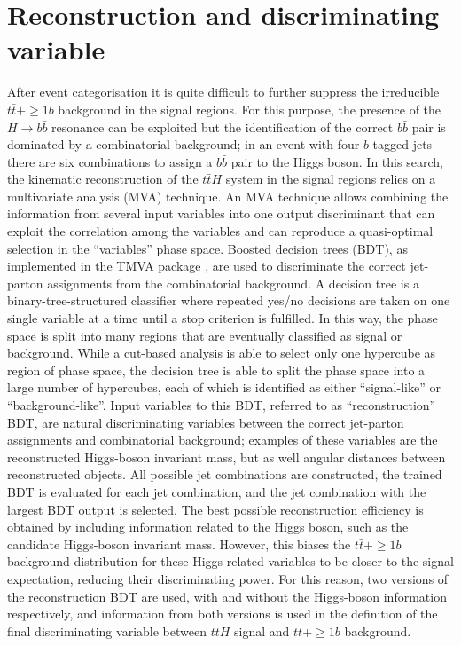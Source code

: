 \section{Reconstruction and discriminating variable}

After event categorisation it is quite difficult to further suppress the irreducible $t\bar{t}+\ge1b$ background in the signal regions. For this purpose, the presence of the $H\to b\bar{b}$ resonance can be exploited  but the identification of the correct $b\bar{b}$ pair is dominated by a combinatorial background; in an event with four $b$-tagged jets there are six combinations to assign a $b\bar{b}$ pair to the Higgs boson. In this search, the kinematic reconstruction of the $t\bar{t}H$ system in the signal regions relies on a multivariate analysis (MVA) technique. An MVA technique allows combining the information from several input variables into one output discriminant that can exploit the correlation among the variables and can reproduce a quasi-optimal selection in the ``variables'' phase space. Boosted decision trees (BDT), as implemented in the TMVA package \cite{tmva}, are used to discriminate the correct jet-parton assignments from the combinatorial background. A decision tree is a binary-tree-structured classifier where repeated yes/no decisions are taken on one single variable at a time until a stop criterion is fulfilled. In this way, the phase space is split into many regions that are eventually classified as signal or background. While a cut-based analysis is able to select only one hypercube as region of phase space,  the decision tree is able to split the phase space into a large number of hypercubes,  each of which is identified as either ``signal-like'' or ``background-like''. Input variables to this BDT, referred to as  ``reconstruction'' BDT, are natural discriminating variables between the correct jet-parton assignments and combinatorial background; examples of these variables are the reconstructed Higgs-boson invariant mass, but as well angular distances between reconstructed objects. All possible jet combinations are constructed, the trained BDT is evaluated for each jet combination, and the jet combination with the largest BDT output is selected.
The best possible reconstruction efficiency is obtained by including information related to the Higgs boson, such as the candidate Higgs-boson invariant mass. However, this biases the $t\bar{t}+\ge1b$ background distribution for these Higgs-related variables to be closer to the signal expectation, reducing their discriminating power. For this reason, two versions of the reconstruction BDT are used, with and without the Higgs-boson information respectively, and information from both versions is used in the definition of the final discriminating variable between $t\bar{t}H$ signal and $t\bar{t}$+$\ge1b$ background.
